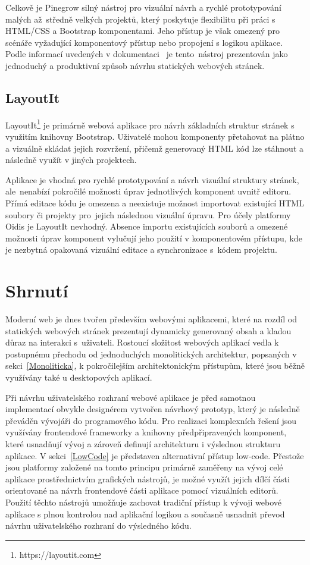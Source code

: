 Celkově je Pinegrow silný nástroj pro vizuální návrh a rychlé prototypování malých až~středně velkých projektů, který poskytuje flexibilitu při práci s HTML/CSS a Bootstrap komponentami. Jeho přístup je však omezený pro scénáře 
vyžadující komponentový přístup nebo propojení s logikou aplikace. Podle informací uvedených v dokumentaci~\cite{PinegrowDocs} je tento~nástroj prezentován jako jednoduchý a produktivní způsob návrhu statických webových stránek.

\subsection{LayoutIt}

LayoutIt\footnote{https://layoutit.com} je primárně webová aplikace pro návrh základních struktur stránek s využitím knihovny Bootstrap. Uživatelé mohou komponenty přetahovat na plátno a vizuálně skládat jejich rozvržení, přičemž generovaný HTML kód lze stáhnout a následně využít v jiných projektech.

Aplikace je vhodná pro rychlé prototypování a návrh vizuální struktury stránek, ale~nenabízí pokročilé možnosti úprav jednotlivých komponent uvnitř editoru. Přímá editace kódu je omezena a neexistuje možnost importovat existující HTML soubory či projekty pro~jejich následnou vizuální úpravu. Pro účely platformy Oidis je LayoutIt nevhodný. Absence importu existujících souborů a omezené možnosti úprav komponent vylučují jeho použití v komponentovém přístupu, kde je nezbytná opakovaná vizuální editace a synchronizace s~kódem projektu.

\section{Shrnutí}
Moderní web je dnes tvořen především webovými aplikacemi, které na rozdíl od statických webových stránek prezentují dynamicky generovaný obsah a kladou důraz na interakci s~uživateli. Rostoucí složitost webových aplikací vedla k postupnému přechodu od jednoduchých monolitických architektur, popsaných v sekci~\ref{Monoliticka}, k pokročilejším architektonickým přístupům, které jsou běžně využívány také u desktopových aplikací.

Při návrhu uživatelského rozhraní webové aplikace je před samotnou implementací obvykle designérem vytvořen návrhový prototyp, který je následně převáděn vývojáři do programového kódu. Pro realizaci komplexních řešení jsou využívány frontendové frameworky a knihovny předpřipravených komponent, které usnadňují vývoj a zároveň definují architekturu i výslednou strukturu aplikace. V sekci~\ref{LowCode} je představen alternativní přístup low-code. Přestože jsou platformy založené na tomto principu primárně zaměřeny na vývoj celé aplikace prostřednictvím grafických nástrojů, je možné využít jejich dílčí části orientované na návrh frontendové části aplikace pomocí vizuálních editorů. Použití těchto nástrojů umožňuje zachovat tradiční přístup k vývoji webové aplikace s plnou kontrolou nad aplikační logikou a současně usnadnit převod návrhu uživatelského rozhraní do výsledného kódu.

